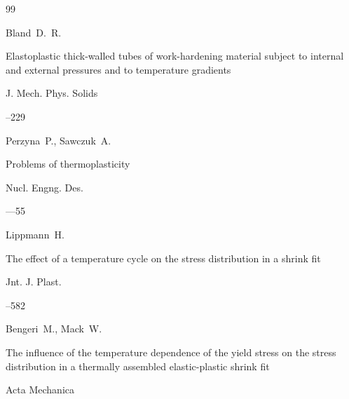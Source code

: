 \begin{thebibliography}{99}




\by Bland~D.~R.

\paper Elastoplastic thick-walled tubes of work-hardening material subject to internal and external pressures and to temperature gradients

\jour J. Mech. Phys. Solids




--229







\by Perzyna~P., Sawczuk~A.

\paper Problems of thermoplasticity

\jour Nucl. Engng. Des.




—55







\by Lippmann~H.

\paper The effect of a temperature cycle on the stress distribution in a shrink fit

\jour Jnt. J. Plast.




--582







\by Bengeri~M., Mack~W. 

\paper The influence of the temperature dependence of the yield stress on the stress distribution in a thermally assembled elastic-plastic shrink fit

\jour Acta Mechanica



\end{thebibliography}

